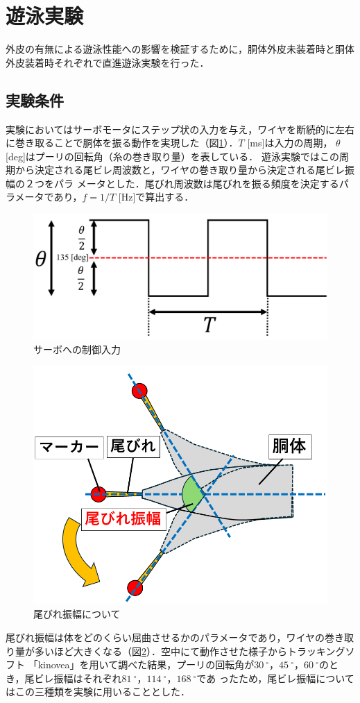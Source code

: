 \newpage
\section{遊泳実験}
外皮の有無による遊泳性能への影響を検証するために，胴体外皮未装着時と胴体外皮装着時それぞれで直進遊泳実験を行った．

\subsection{実験条件}
実験においてはサーボモータにステップ状の入力を与え，ワイヤを断続的に左右に巻き取ることで胴体を振る動作を実現した（図\ref{fig:servo_seigyo}）．$T$ [ms]は入力の周期，
$\theta$ [deg]はプーリの回転角（糸の巻き取り量）を表している．
遊泳実験ではこの周期から決定される尾ビレ周波数と，ワイヤの巻き取り量から決定される尾ビレ振幅の２つをパラ
メータとした．尾びれ周波数は尾びれを振る頻度を決定するパラメータであり，$f = 1/T$ [Hz]で算出する．
\begin{figure}[hb]
    \centering
    \includegraphics[width=0.8\linewidth]{chapters/picture/servo.png}
    \caption{サーボへの制御入力}
    \label{fig:servo_seigyo}
\end{figure}
\begin{figure}[hb]
    \centering
    \includegraphics[width=0.6\linewidth]{chapters/picture/obire_amp.png}
    \caption{尾びれ振幅について}
    \label{fig:obire_amp}
\end{figure}
尾びれ振幅は体をどのくらい屈曲させるかのパラメータであり，ワイヤの巻き取り量が多いほど大きくなる（図\ref{fig:obire_amp}）．空中にて動作させた様子からトラッキングソフト
「kinovea」を用いて調べた結果，プーリの回転角が$30\:^\circ$，$45\:^\circ$，$60\:^\circ$のとき，尾ビレ振幅はそれぞれ$81\:^\circ$，$114\:^\circ$，$168\:^\circ$であ
ったため，尾ビレ振幅についてはこの三種類を実験に用いることとした． 

